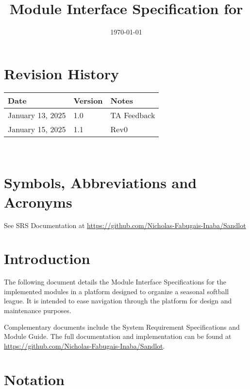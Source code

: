 \documentclass[12pt, titlepage]{article}
\begin{document}
\title{Module Interface Specification for \progname{}}

\author{\authname}

\date{\today}

\maketitle


\section{Revision History}

\begin{tabularx}{\textwidth}{p{3cm}p{2cm}X}
\toprule {\bf Date} & {\bf Version} & {\bf Notes}\\
\midrule
January 13, 2025 & 1.0 & TA Feedback\\
January 15, 2025 & 1.1 & Rev0\\
\bottomrule
\end{tabularx}

~\newpage

\section{Symbols, Abbreviations and Acronyms}

See SRS Documentation at \url{https://github.com/Nicholas-Fabugais-Inaba/Sandlot}

\newpage

\tableofcontents

\newpage


\section{Introduction}

The following document details the Module Interface Specifications for
the implemented modules in a platform designed to organize a seasonal
softball league. It is intended to ease navigation through the platform
for design and maintenance purposes.

Complementary documents include the System Requirement Specifications
and Module Guide.  The full documentation and implementation can be
found at \url{https://github.com/Nicholas-Fabugais-Inaba/Sandlot}.  

\section{Notation}
\end{document}
